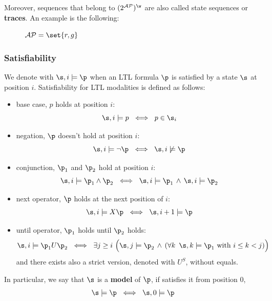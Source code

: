 \documentclass[oneside]{academica}
\begin{document}
Moreover, sequences that belong to $(2^{\AP})^\w$ are also called state sequences or \textbf{traces}.
An example is the following:
\begin{figure}[H]
  \hspace{0.05\textwidth}
  \begin{minipage}{0.45\textwidth}
    \begin{center}
      $\AP = \set{r,g}$
    \end{center}
  \end{minipage}
  \begin{minipage}{0.45\textwidth}
    \begin{center}
      
    \end{center}
  \end{minipage}
\end{figure}

\subsubsection{Satisfiability}

We denote with $\s,i \models \p$ when an LTL formula $\p$ is satisfied by a state $\s$ at position $i$.
Satisfiability for LTL modalities is defined as follows:
\begin{itemize}
  \item base case, $p$ holds at position $i$:
    \begin{equation*}
      \s,i \models p \ \iff\  p \in \s_i
    \end{equation*}
  \item negation, $\p$ doesn't hold at position $i$:
    \begin{equation*}
      \s,i \models \neg\p \ \iff\  \s,i \not\models \p
    \end{equation*}
  \item conjunction, $\p_1$ and $\p_2$ hold at position $i$:
    \begin{equation*}
      \s,i \models \p_1 \land \p_2 \ \iff\  \s,i \models \p_1 \,\land\, \s,i \models \p_2
    \end{equation*}
  \item next operator, $\p$ holds at the next position of $i$:
    \begin{equation*}
      \s,i \models X\p \ \iff\ \s,i+1 \models \p
    \end{equation*}
  \item until operator, $\p_1$ holds until $\p_2$ holds:
    \begin{equation*}
      \s,i \models \p_1 U \p_2 \ \iff\ \exists j \ge i \ \Big(\s,j \models \p_2 \,\land\, (\forall k\ \, \s,k \models \p_1 \text{ with } i \leq k < j)\Big)
    \end{equation*}
    and there exists also a strict version, denoted with $U^S$, without equals.
\end{itemize}
In particular, we say that $\s$ is a \textbf{model} of $\p$, if satisfies it from position 0, \ie
\begin{equation*}
  \s \models \p \ \iff\  \s,0 \models \p
\end{equation*}
\end{document}
